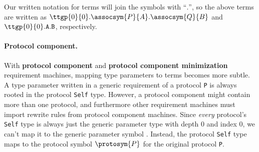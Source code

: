 \documentclass[../generics]{subfiles}
\begin{document}
\begin{quote}
\end{quote}
Our written notation for terms will join the symbols with ``$.$'', so the above terms are written as $\ttgp{0}{0}.\assocsym{P}{A}.\assocsym{Q}{B}$ and $\ttgp{0}{0}.\texttt{A}.\texttt{B}$, respectively.

\paragraph{Protocol component.}
%
%
With \textbf{protocol component} and \textbf{protocol component minimization} requirement machines, mapping type parameters to terms becomes more subtle. A type parameter written in a generic requirement of a protocol \texttt{P} is always rooted in the protocol \texttt{Self} type. However, a protocol component might contain more than one protocol, and furthermore other requirement machines must import rewrite rules from protocol component machines. Since \emph{every} protocol's \texttt{Self} type is always just the generic parameter type  with depth 0 and index 0, we can't map it to the generic parameter symbol . Instead, the protocol \texttt{Self} type maps to the protocol symbol $\protosym{P}$ for the original protocol \texttt{P}.
\end{document}
